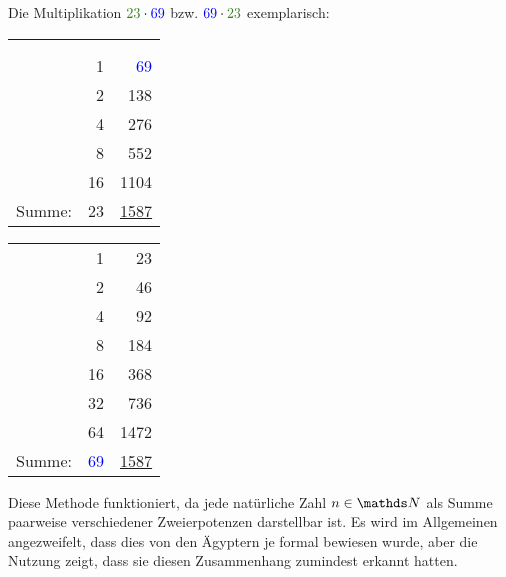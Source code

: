 	\begin{bsp}\label{Bsp: EgypMult}
		Die Multiplikation $\textcolor{OliveGreen}{23} \cdot \textcolor{blue}{69}$ bzw. $\textcolor{blue}{69} \cdot \textcolor{OliveGreen}{23}$ exemplarisch:\\
		\begin{minipage}{.5\textwidth}
				\begin{center}
				\begin{tabular}{r r r}
					&&\\
					&&\\
					\checkmark &1 & \textcolor{blue}{69}\\
					\checkmark &2 & 138\\
					\checkmark &4 & 276\\
					&8 & 552\\
					\checkmark &16 & 1104\\ \hline
					Summe: &\textcolor{OliveGreen}{23} & \underline{\underline{1587}}\\
				\end{tabular}
			\end{center}
		\end{minipage}
		\begin{minipage}{.5\textwidth}
			\begin{center}
				\begin{tabular}{r r r}
					\checkmark & 1 & \textcolor{OliveGreen}{23}\\
					& 2 & 46\\
					\checkmark & 4 & 92\\
					& 8 & 184\\
					& 16 & 368\\
					& 32 & 736\\
					\checkmark & 64 & 1472\\ \hline
					Summe: & \textcolor{blue}{69} & \underline{\underline{1587}}\\
				\end{tabular}
			\end{center}
		\end{minipage}
	
	\end{bsp}
	
	Diese Methode funktioniert, da jede natürliche Zahl $n \in \N$ als Summe paarweise verschiedener Zweierpotenzen darstellbar ist. Es wird im Allgemeinen angezweifelt, dass dies von den Ägyptern je formal bewiesen wurde, aber die Nutzung zeigt, dass sie diesen Zusammenhang zumindest erkannt hatten. \cite[S. 38]{Burton2011}
